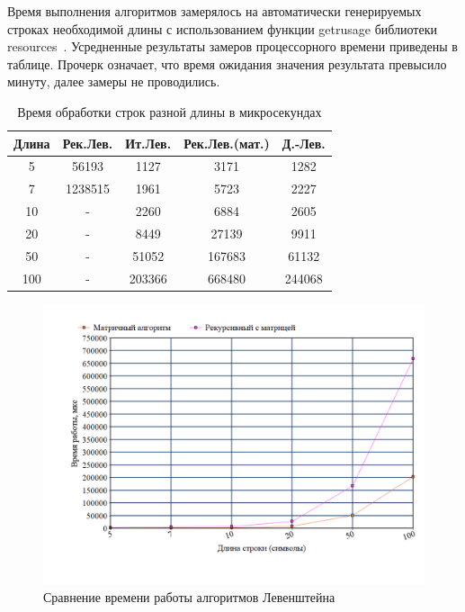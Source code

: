 \documentclass[a4paper,oneside,14pt]{extreport}
\begin{document}
Время выполнения алгоритмов замерялось на автоматически генерируемых строках необходимой длины с использованием функции getrusage библиотеки resources~\cite{resource}. Усредненные результаты замеров процессорного времени приведены в таблице. Прочерк означает, что время ожидания значения результата превысило минуту, далее замеры не проводились. 
\begin{table}[h]
	\begin{center}
		\captionsetup{justification=raggedleft, singlelinecheck=false}
		\caption{\label{time} Время обработки строк разной длины в микросекундах}
		\begin{tabular}{|c c c c c|} 
			\hline
			Длина&Рек.Лев.&Ит.Лев.&Рек.Лев.(мат.)& Д.-Лев.\\ [0.5ex]
			\hline
			5  &  56193  &  1127  &  3171  &  1282 \\
			\hline
			7  &  1238515  &  1961  &  5723  &  2227 \\
			\hline
			10  & - &  2260  &  6884  &  2605 \\
			\hline
			20  & - &  8449  &  27139  &  9911 \\
			\hline
			50  & - &  51052  &  167683  &  61132 \\
			\hline
			100  & - &  203366  &  668480  &  244068 \\
			\hline
		\end{tabular}
	\end{center}
\end{table}

\begin{figure}[H]
	\includegraphics[width=1\linewidth]{images/lev_graph}
	\caption{Сравнение времени работы алгоритмов Левенштейна}
	\label{fig:lev_graph}
\end{figure}
\end{document}
